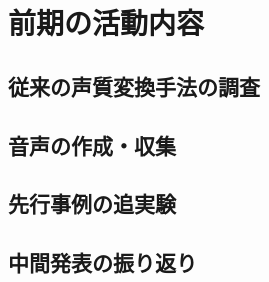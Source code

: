 \section{前期の活動内容}
\subsection{従来の声質変換手法の調査}

\subsection{音声の作成・収集}

\subsection{先行事例の追実験}

\subsection{中間発表の振り返り}
